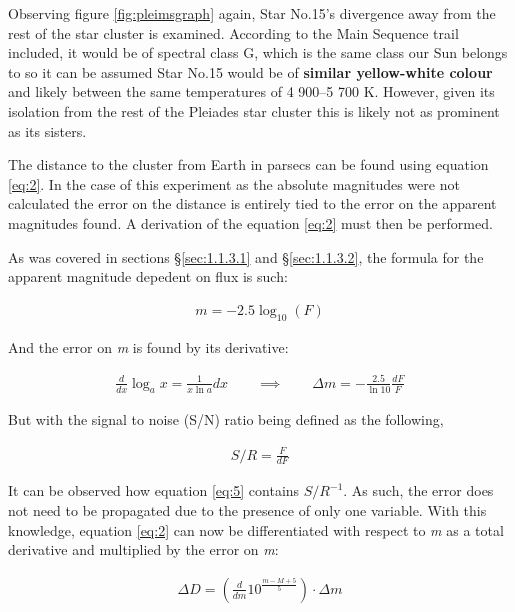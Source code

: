 \documentclass[12pt]{article}
\begin{document}
Observing figure \ref{fig:pleimsgraph} again, Star No.15's divergence away from the rest of the star cluster is examined. According to the Main Sequence trail included,
it would be of spectral class G, which is the same class our Sun belongs to so it can be assumed Star No.15 would be of \textbf{similar yellow-white colour} and likely between the same temperatures of 4 900–5 700 K. 
However, given its isolation from the rest of the Pleiades star cluster this is likely not as prominent as its sisters.

The distance to the cluster from Earth in parsecs can be found using equation \ref{eq:2}. In the case of this experiment as the absolute magnitudes were not calculated the error on the distance is entirely tied 
to the error on the apparent magnitudes found. A derivation of the equation \ref{eq:2} must then be performed.

As was covered in sections §\ref{sec:1.1.3.1} and §\ref{sec:1.1.3.2}, the formula for the apparent magnitude depedent on flux is such:

\vspace{-1.5ex}
\begin{gather*}
    m = -2.5 \log_{10}(F)
\end{gather*}

And the error on \textit{m} is found by its derivative:

\vspace{-1.5ex}
\begin{gather} \label{eq:5}
    \frac{d}{dx} \log_ax = \frac{1}{x\ln a}dx \qquad \implies \qquad \Delta m = - \frac{2.5}{\ln 10}\frac{dF}{F}
\end{gather}

But with the signal to noise (S/N) ratio being defined as the following,

\vspace{-1.5ex}
\begin{gather*}
    S/R = \frac{F}{dF}
\end{gather*}

It can be observed how equation \ref{eq:5} contains $S/R^{-1}$. As such, the error does not need to be propagated due to the presence of only one variable.
With this knowledge, equation \ref{eq:2} can now be differentiated with respect to \textit{m} as a total derivative and multiplied by the error on \textit{m}:

\vspace{-1.5ex}
\begin{gather*}
    \Delta D = \left( \frac{d}{dm} 10^{\frac{m - M + 5}{5}} \right) \cdot \Delta m
\end{gather*}
\end{document}

